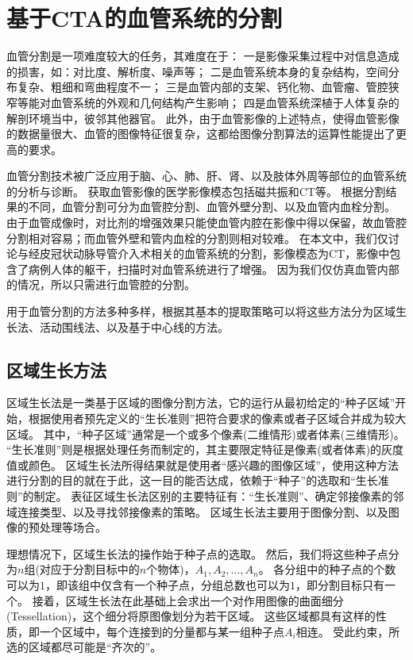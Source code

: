 \section{基于CTA的血管系统的分割}
\label{sec3_2}

血管分割是一项难度较大的任务，其难度在于\cite{Lesage2009Review}：
一是影像采集过程中对信息造成的损害，如：对比度、解析度、噪声等；
二是血管系统本身的复杂结构，空间分布复杂、粗细和弯曲程度不一；
三是血管内部的支架、钙化物、血管瘤、管腔狭窄等能对血管系统的外观和几何结构产生影响；
四是血管系统深植于人体复杂的解剖环境当中，彼邻其他器官。
此外，由于血管影像的上述特点，使得血管影像的数据量很大、血管的图像特征很复杂，这都给图像分割算法的运算性能提出了更高的要求。

血管分割技术被广泛应用于脑、心、肺、肝、肾、以及肢体外周等部位的血管系统的分析与诊断。
获取血管影像的医学影像模态包括磁共振和CT等。
根据分割结果的不同，血管分割可分为血管腔分割、血管外壁分割、以及血管内血栓分割\cite{Lesage2009Review}。
由于血管成像时，对比剂的增强效果只能使血管内腔在影像中得以保留，故血管腔分割相对容易；而血管外壁和管内血栓的分割则相对较难。
在本文中，我们仅讨论与经皮冠状动脉导管介入术相关的血管系统的分割，影像模态为CT，影像中包含了病例人体的躯干，扫描时对血管系统进行了增强。
因为我们仅仿真血管内部的情况，所以只需进行血管腔的分割。

用于血管分割的方法多种多样，根据其基本的提取策略可以将这些方法分为区域生长法、活动围线法、以及基于中心线的方法。

\subsection{区域生长方法}

区域生长法是一类基于区域的图像分割方法，它的运行从最初给定的“种子区域”开始，根据使用者预先定义的“生长准则”把符合要求的像素或者子区域合并成为较大区域。
其中，“种子区域”通常是一个或多个像素(二维情形)或者体素(三维情形)。
“生长准则”则是根据处理任务而制定的，其主要限定特征是像素(或者体素)的灰度值或颜色\cite{Gonzalez2004Matlab}。
区域生长法所得结果就是使用者“感兴趣的图像区域”，使用这种方法进行分割的目的就在于此，这一目的能否达成，依赖于“种子”的选取和“生长准则”的制定。
表征区域生长法区别的主要特征有：“生长准则”、确定邻接像素的邻域连接类型、以及寻找邻接像素的策略\cite{Ibanez2005ITKGuide}。
区域生长法主要用于图像分割、以及图像的预处理等场合。

理想情况下，区域生长法的操作始于种子点的选取。
然后，我们将这些种子点分为$n$组(对应于分割目标中的$n$个物体)，$A_1, A_2, \ldots, A_n$。
各分组中的种子点的个数可以为$1$，即该组中仅含有一个种子点，分组总数也可以为$1$，即分割目标只有一个。
接着，区域生长法在此基础上会求出一个对作用图像的曲面细分(Tessellation)，这个细分将原图像划分为若干区域。
这些区域都具有这样的性质，即一个区域中，每个连接到的分量都与某一组种子点$A_i$相连。
受此约束，所选的区域都尽可能是“齐次的”\cite{Adams1994SRG}。

